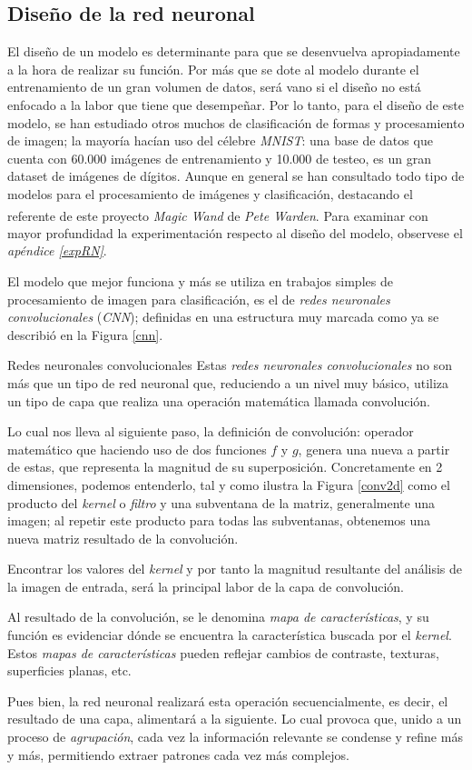 \subsection{Diseño de la red neuronal\label{disenioRN}}
El diseño de un modelo es determinante para que se desenvuelva apropiadamente
a la hora de realizar su función. Por más que se dote al modelo durante el
entrenamiento de un gran volumen de datos, será vano si el diseño no está enfocado
a la labor que tiene que desempeñar. Por lo tanto, para el diseño de este modelo,
se han estudiado otros muchos de clasificación de formas y procesamiento de imagen; la
mayoría hacían uso del célebre \textit{MNIST}: una base de datos que cuenta con
60.000 imágenes de entrenamiento y 10.000 de testeo, es un gran dataset de imágenes
de dígitos. Aunque en general se han consultado todo tipo de modelos para el
procesamiento de imágenes y clasificación, destacando el referente de este proyecto
\textit{Magic Wand}\textsuperscript{\cite{petewardenmw}} de \textit{Pete Warden}.
Para examinar con mayor profundidad la experimentación respecto al diseño del modelo,
observese el \textit{apéndice \ref{expRN}}.

El modelo que mejor funciona y más se utiliza en trabajos simples de procesamiento
de imagen para clasificación, es el de \textit{redes neuronales convolucionales}
(\textit{CNN}); definidas en una estructura muy marcada como ya se describió
en la Figura \ref{cnn}.
\begin{teoria}{Redes neuronales convolucionales}
Estas \textit{redes neuronales convolucionales}
no son más que un tipo de red neuronal que, reduciendo a un nivel muy básico,
utiliza un tipo de capa que realiza una operación matemática llamada convolución.

Lo cual nos lleva al siguiente paso, la definición de convolución: operador
matemático que haciendo uso de dos funciones $f$ y $g$, genera una nueva
a partir de estas, que representa la magnitud de su superposición.
Concretamente en 2 dimensiones, podemos entenderlo, tal y como ilustra la
Figura \ref{conv2d} como el producto del \textit{kernel} o \textit{filtro}
y una subventana de la matriz, generalmente una imagen; al repetir este producto
para todas las subventanas, obtenemos una nueva matriz resultado de la convolución.

Encontrar los valores del \textit{kernel} y por tanto la magnitud resultante
del análisis de la imagen de entrada, será la principal labor de la capa de
convolución.

Al resultado de la convolución, se le denomina \textit{mapa de características},
y su función es evidenciar dónde se encuentra la característica buscada por el
\textit{kernel}. Estos \textit{mapas de características} pueden reflejar
cambios de contraste, texturas, superficies planas, etc.

Pues bien, la red neuronal realizará esta operación secuencialmente, es decir,
el resultado de una capa, alimentará a la siguiente. Lo cual provoca que,
unido a un proceso de \textit{agrupación}, cada vez la información relevante
se condense y refine más y más, permitiendo extraer patrones cada vez más
complejos.
\end{teoria}\newpage

